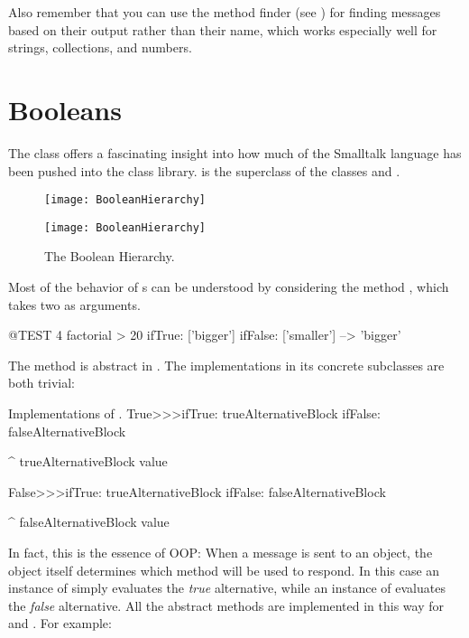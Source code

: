\documentclass[a4paper,10pt,twoside]{book}
\begin{document}

Also remember that you can use the method finder (see ) for finding messages based on their output rather than their name, which works especially well for strings, collections, and numbers.

\section{Booleans}

The class  offers a fascinating insight into how much of the Smalltalk language has been pushed into the class library.
 is the  superclass of the  classes  and .

\begin{figure}[ht]
\ifluluelse
	{\centerline {\texttt{[image: BooleanHierarchy]}}}
	{\centerline {\texttt{[image: BooleanHierarchy]}}}
\caption{The Boolean Hierarchy.\label{fig:booleans}}
\end{figure}

Most of the behavior of s can be understood by considering the method , which takes two  as arguments.

\begin{code}{@TEST}
4 factorial > 20 ifTrue: ['bigger'] ifFalse: ['smaller'] --> 'bigger'
\end{code}

The method is abstract in .
The implementations in its concrete subclasses are both trivial:

\begin{method}{Implementations of .}
True>>>ifTrue: trueAlternativeBlock ifFalse: falseAlternativeBlock

    ^ trueAlternativeBlock value


False>>>ifTrue: trueAlternativeBlock ifFalse: falseAlternativeBlock

    ^ falseAlternativeBlock value
\end{method}

In fact, this is the essence of OOP:
When a message is sent to an object, the object itself determines which method will be used to respond.
In this case an instance of  simply evaluates the \emph{true} alternative, while an instance of  evaluates the \emph{false} alternative.
All the abstract  methods are implemented in this way for  and .
For example:
\end{document}
